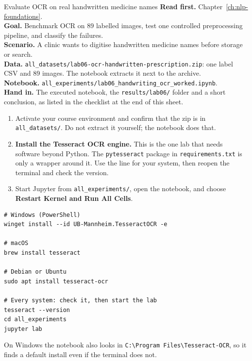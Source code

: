 
\begin{labproject}{Evaluate OCR on real handwritten medicine names}
\textbf{Read first.} Chapter~\ref{ch:nlp-foundations}.\\
\textbf{Goal.} Benchmark OCR on 89 labelled images, test one controlled preprocessing pipeline, and classify the failures.\\
\textbf{Scenario.} A clinic wants to digitise handwritten medicine names before storage or search.\\
\textbf{Data.} \texttt{all\_datasets/lab06-ocr-handwritten-prescription.zip}: one label CSV and 89 images. The notebook extracts it next to the archive.\\
\textbf{Notebook.} \texttt{all\_experiments/lab06\_handwriting\_ocr\_worked.ipynb}.\\
\textbf{Hand in.} The executed notebook, the \texttt{results/lab06/} folder and a short conclusion, as listed in the checklist at the end of this sheet.
\end{labproject}

\begin{labmode}
\begin{enumerate}
  \item Activate your course environment and confirm that the zip is in \texttt{all\_datasets/}. Do not extract it yourself; the notebook does that.
  \item \textbf{Install the Tesseract OCR engine.} This is the one lab that needs software beyond Python. The \texttt{pytesseract} package in \texttt{requirements.txt} is only a wrapper around it. Use the line for your system, then reopen the terminal and check the version.
  \item Start Jupyter from \texttt{all\_experiments/}, open the notebook, and choose \textbf{Restart Kernel and Run All Cells}.
\end{enumerate}
\begin{lstlisting}[style=utpterminal]
# Windows (PowerShell)
winget install --id UB-Mannheim.TesseractOCR -e

# macOS
brew install tesseract

# Debian or Ubuntu
sudo apt install tesseract-ocr

# Every system: check it, then start the lab
tesseract --version
cd all_experiments
jupyter lab
\end{lstlisting}
On Windows the notebook also looks in \texttt{C:\textbackslash Program Files\textbackslash Tesseract-OCR}, so it finds a default install even if the terminal does not.
\end{labmode}

